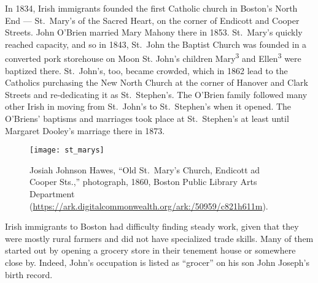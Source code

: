 In 1834, Irish immigrants founded the first Catholic church in Boston's North End --- St.\ Mary's of the Sacred Heart, on the corner of Endicott and Cooper Streets.\cite{Todisco:26} John O'Brien married Mary Mahony there in 1853.\cite{John2OBrienMarriage} St.\ Mary's quickly reached capacity, and so in 1843, St.\ John the Baptist Church was founded in a converted pork storehouse on Moon St.\cite{Goldfeld:101,Sullivan:128} John's children Mary\textsuperscript{3} and Ellen\textsuperscript{3} were baptized there. St.\ John's, too, became crowded, which in 1862 lead to the Catholics purchasing the New North Church at the corner of Hanover and Clark Streets and re-dedicating it as St.\ Stephen's.\cite{Sullivan:128} The O'Brien family followed many other Irish in moving from St.\ John's to St.\ Stephen's when it opened. The O'Briens' baptisms and marriages took place at St.\ Stephen's at least until Margaret Dooley's marriage there in 1873.\cite{RobertFernaldMarriage}

\begin{figure}
	\centering
	\texttt{[image: st\_marys]}
	\caption{Josiah Johnson Hawes, ``Old St.\ Mary's Church, Endicott ad Cooper Sts.,'' photograph, 1860, Boston Public Library Arts Department (\url{https://ark.digitalcommonwealth.org/ark:/50959/c821h611m}).}
\end{figure}

Irish immigrants to Boston had difficulty finding steady work, given that they were mostly rural farmers and did not have specialized trade skills.\cite{Ryan:21} Many of them started out by opening a grocery store in their tenement house or somewhere close by.\cite{Ryan:83} Indeed, John's occupation is listed as ``grocer'' on his son John Joseph's birth record.\cite{John3OBrienBirth} 

